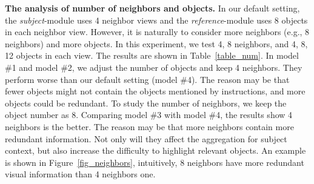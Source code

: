 \documentclass[sigconf]{acmart}
\begin{document}
\noindent\textbf{The analysis of number of neighbors and objects.} In our default setting, the \textit{subject}-module uses 4 neighbor views and the \textit{reference}-module uses 8 objects in each neighbor view. 
However, it is naturally to consider more neighbors (e.g., 8 neighbors) and more objects. In this experiment, we test 4, 8 neighbors, and 4, 8, 12 objects in each view. The results are shown in Table~\ref{table_num}. 
In model \#1 and model \#2, we adjust the number of objects and keep 4 neighbors. They perform worse than our default setting (model \#4). The reason may be  that fewer objects might not contain the objects mentioned by instructions, and more objects could be redundant. 
To study the number of neighbors, we keep the object number as 8. Comparing model \#3 with model \#4, the results show 4 neighbors is the better. The reason   may be that more neighbors contain more redundant information. Not only will they affect the aggregation for subject context, but also increase the difficulty to highlight relevant objects. An example is shown in Figure~\ref{fig_neighbors}, intuitively, 8 neighbors have more redundant visual information than 4 neighbors one. 
\end{document}
